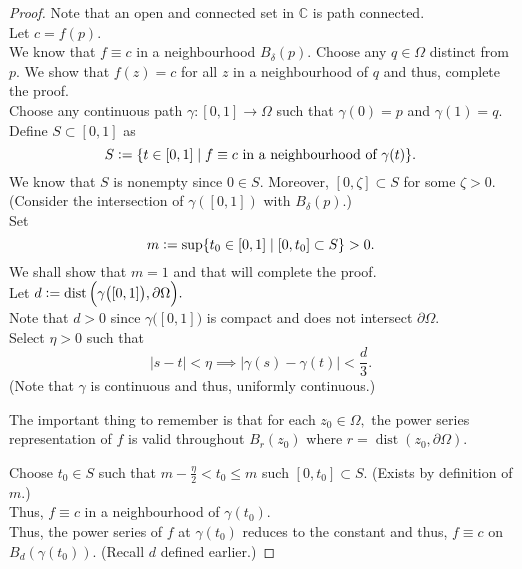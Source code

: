 \constnbd*\label{lem:constnbd2}
\begin{flushright}\hyperref[lem:constnbd]{\upsym}\end{flushright}
\begin{proof}
	Note that an open and connected set in $\mathbb{C}$ is path connected.\\
	Let $c = f(p).$\\
	We know that $f\equiv c$ in a neighbourhood $B_\delta(p).$ Choose any $q \in \Omega$ distinct from $p.$ We show that $f(z) = c$ for all $z$ in a neighbourhood of $q$ and thus, complete the proof.\\
	Choose any continuous path $\gamma:[0, 1] \to \Omega$ such that $\gamma(0) = p$ and $\gamma(1) = q.$\\
	Define $S \subset [0, 1]$ as
	\begin{equation*} 
		S \vcentcolon= \{t \in [0, 1] \mid f \equiv c\text{ in a neighbourhood of }\gamma(t)\}.
	\end{equation*}
	We know that $S$ is nonempty since $0 \in S.$ Moreover, $[0, \zeta] \subset S$ for some $\zeta > 0.$ (Consider the intersection of $\gamma([0, 1])$ with $B_\delta(p).$)\\
	Set
	\begin{equation*} 
		m \vcentcolon= \sup\{t_0 \in [0, 1] \mid [0, t_0] \subset S\} > 0.
	\end{equation*}
	We shall show that $m = 1$ and that will complete the proof.\\
	Let $d \vcentcolon= \operatorname{dist}\Big(\gamma\big([0, 1]\big), \partial \Omega\Big).$\\
	Note that $d > 0$ since $\gamma\big([0, 1]\big)$ is compact and does not intersect $\partial\Omega.$\\
	Select $\eta > 0$ such that 
	\begin{equation*} 
		\left|s - t\right| < \eta \implies \left|\gamma(s) - \gamma(t)\right| < \frac{d}{3}.
	\end{equation*}
	(Note that $\gamma$ is continuous and thus, uniformly continuous.)

	The important thing to remember is that for each $z_0 \in \Omega,$ the power series representation of $f$ is valid throughout $B_r(z_0)$ where $r = \operatorname{dist}(z_0, \partial \Omega).$

	Choose $t_0 \in S$ such that $m - \frac{\eta}{2} < t_0 \le m$ such $[0, t_0] \subset S.$ (Exists by definition of $m.$)\\
	Thus, $f \equiv c$ in a neighbourhood of $\gamma(t_0).$\\
	Thus, the power series of $f$ at $\gamma(t_0)$ reduces to the constant and thus, $f \equiv c$ on $B_d(\gamma(t_0)).$ (Recall $d$ defined earlier.)


\end{proof}
